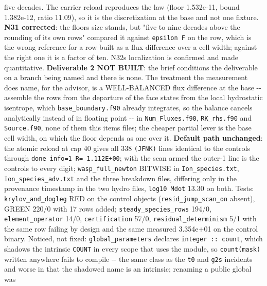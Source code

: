 \documentclass[english,a4paper]{my_memo}
\begin{document}
\begin{itemize}
  five decades. The carrier reload reproduces the law (floor 1.532e-11,
  bound 1.382e-12, ratio 11.09), so it is the discretization at the base
  and not one fixture. \textbf{N31 corrected}: the floor\textquotesingle s size stands, but
  "five to nine decades above the rounding of its own rows" compared it
  against \texttt{epsilon\ \textbar{}\textbar{}F\textbar{}\textbar{}} on the row, which is the wrong reference for a
  row built as a flux difference over a cell width; against the right
  one it is a factor of ten. N32\textquotesingle s localization is confirmed and made
  quantitative. \textbf{Deliverable 2 NOT BUILT}: the brief conditions the
  deliverable on a branch being named and there is none. The treatment the
  measurement does name, for the advisor, is a WELL-BALANCED flux
  difference at the base -\/- assemble the rows from the departure of the
  face states from the local hydrostatic isentrope, which
  \texttt{base\_boundary.f90} already integrates, so the balance cancels
  analytically instead of in floating point -\/- in \texttt{Num\_Fluxes.f90},
  \texttt{RK\_rhs.f90} and \texttt{Source.f90}, none of them this item\textquotesingle s files; the
  cheaper partial lever is the base cell width, on which the floor
  depends as one over it. \textbf{Default path unchanged}: the atomic reload
  at cap 40 gives all 338 \texttt{(JFNK)} lines identical to the control\textquotesingle s
  through \texttt{done\ info=1\ \textbar{}\textbar{}R\textbar{}\textbar{}=\ 1.112E+00}; with the scan armed the
  outer-1 line is the control\textquotesingle s to every digit; \texttt{wasp\_full\_newton}
  BITWISE in \texttt{Ion\_species.txt}, \texttt{Ion\_species\_adv.txt} and the three
  breakdown files, differing only in the provenance timestamp in the two
  hydro files, \texttt{log10\ Mdot} 13.30 on both. Tests: \texttt{krylov\_and\_dogleg}
  RED on the control objects (\texttt{resid\_jump\_scan\_on} absent), GREEN 220/0
  with 17 rows added; \texttt{steady\_species\_rows} 194/0, \texttt{element\_operator}
  14/0, \texttt{certification} 57/0, \texttt{residual\_determinism} 5/1 with the same
  row failing by design and the same measured 3.354e+01 on the control
  binary. Noticed, not fixed: \texttt{global\_parameters} declares
  \texttt{integer\ ::\ count}, which shadows the intrinsic \texttt{COUNT} in every scope
  that uses the module, so \texttt{count(mask)} written anywhere fails to
  compile -\/- the same class as the \texttt{t0} and \texttt{g2s} incidents and worse in
  that the shadowed name is an intrinsic; renaming a public global was

\end{itemize}
\end{document}
